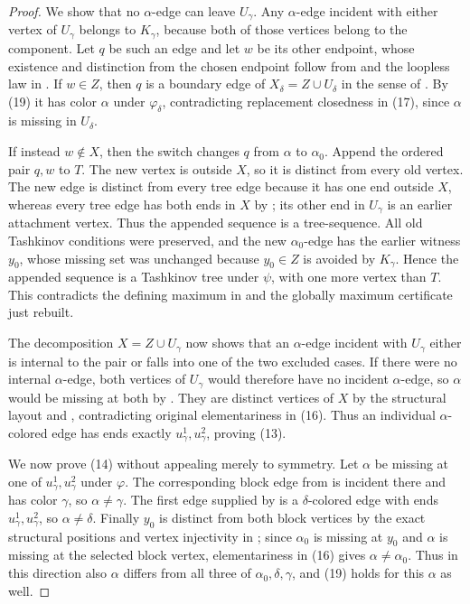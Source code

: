 \begin{proof}
We show that no $\alpha$-edge can leave $U_\gamma$.  Any
$\alpha$-edge incident with either vertex of $U_\gamma$ belongs to
$K_\gamma$, because both of those vertices belong to the component.  Let
$q$ be such an edge and let $w$ be its other endpoint, whose existence
and distinction from the chosen endpoint follow from
 and the loopless law in
.  If $w\in Z$, then $q$ is a boundary edge
of $X_\delta=Z\cup U_\delta$ in the sense of
.  By (19) it has color $\alpha$ under
$\varphi_\delta$, contradicting replacement closedness in (17), since
$\alpha$ is missing in $U_\delta$.

If instead $w\notin X$, then the switch changes $q$ from $\alpha$ to
$\alpha_0$.  Append the ordered pair $q,w$ to $T$.  The new vertex is
outside $X$, so it is distinct from every old vertex.  The new edge is
distinct from every tree edge because it has one end outside $X$, whereas
every tree edge has both ends in $X$ by ; its other
end in $U_\gamma$ is an earlier attachment vertex.  Thus the appended
sequence is a tree-sequence.  All old Tashkinov conditions were preserved,
and the new $\alpha_0$-edge has the earlier witness $y_0$, whose missing
set was unchanged because $y_0\in Z$ is avoided by $K_\gamma$.  Hence the
appended sequence is a Tashkinov tree under $\psi$, with one more vertex
than $T$.  This contradicts the defining maximum in
 and the globally maximum certificate just rebuilt.

The decomposition $X=Z\cup U_\gamma$ now shows that an $\alpha$-edge
incident with $U_\gamma$ either is internal to the pair or falls into one
of the two excluded cases.  If there were no internal $\alpha$-edge, both
vertices of $U_\gamma$ would therefore have no incident $\alpha$-edge,
so $\alpha$ would be missing at both by .  They are
distinct vertices of $X$ by the structural layout and
, contradicting original elementariness in (16).
Thus an individual $\alpha$-colored edge has ends exactly
$u^1_\gamma,u^2_\gamma$, proving (13).

We now prove (14) without appealing merely to symmetry.  Let $\alpha$ be
missing at one of $u^1_\gamma,u^2_\gamma$ under $\varphi$.  The
corresponding block edge from
 is incident there and has color
$\gamma$, so $\alpha\ne\gamma$.  The first edge supplied by
 is a $\delta$-colored edge
with ends $u^1_\gamma,u^2_\gamma$, so $\alpha\ne\delta$.  Finally $y_0$
is distinct from both block vertices by the exact structural positions and
vertex injectivity in ; since $\alpha_0$ is missing
at $y_0$ and $\alpha$ is missing at the selected block vertex,
elementariness in (16) gives $\alpha\ne\alpha_0$.  Thus in this direction
also $\alpha$ differs from all three of
$\alpha_0,\delta,\gamma$, and (19) holds for this $\alpha$ as well.


\end{proof}
